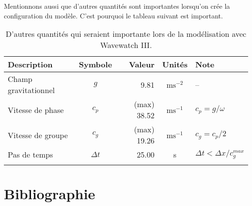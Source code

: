 \documentclass[10pt]{article}
\numberwithin{equation}{section}
\begin{document}
Mentionnons aussi que d'autres quantités sont importantes lorsqu'on crée la configuration du modèle.
C'est pourquoi le tableau suivant est important.

\begin{table}[!h]
\caption{D'autres quantités qui seraient importante lors de la modélisation avec Wavewatch III.}
\centering
\begin{tabular}{lcrcl}
\hline
\hline
Description & Symbole & Valeur & Unités & Note\\
\hline
Champ gravitationnel & \(g\) & 9.81 & \(\mathrm{ms}^{-2}\) & --\\
Vitesse de phase & \(c_p\) & (max) 38.52 & \(\mathrm{ms}^{-1}\) & \(c_p = g/\omega\)\\
Vitesse de groupe & \(c_g\) & (max) 19.26 & \(\mathrm{ms}^{-1}\) & \(c_g = c_p/2\)\\
Pas de temps & \(\Delta t\) & 25.00 & s & \(\Delta t < \Delta x/c^{max}_g\)\\
 &  &  &  & \\
\end{tabular}
\end{table}
\section{Bibliographie}
\label{sec:org4e3e49d}
\printbibliography
\end{document}
